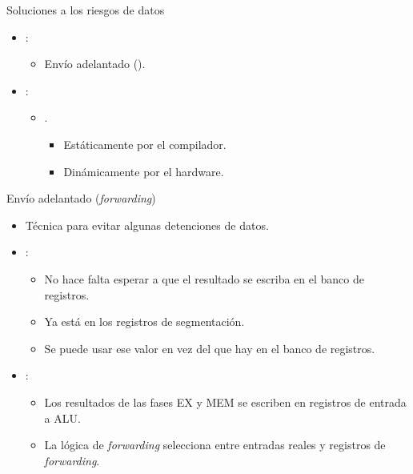 \begin{frame}[t]{Soluciones a los riesgos de datos}
\begin{itemize}
  \item {}:
    \begin{itemize}
      \item Envío adelantado ().
    \end{itemize}

  \item {}:
    \begin{itemize}
      \item {}.
        \begin{itemize}
          \item Estáticamente por el compilador.
          \item Dinámicamente por el hardware.
        \end{itemize}
    \end{itemize}  
\end{itemize}
 \end{frame}

\begin{frame}[t]{Envío adelantado (\emph{forwarding})}
\begin{itemize}
  \item Técnica para evitar algunas detenciones de datos.
  \item {}:
    \begin{itemize}
      \item No hace falta esperar a que el resultado se escriba en el banco de registros. 
      \item Ya está en los registros de segmentación.
      \item Se puede usar ese valor en vez del que hay en el banco de registros.
    \end{itemize}
  \item {}:
    \begin{itemize}
      \item Los resultados de las fases EX y MEM se escriben en registros de entrada a ALU.
      \item La lógica de \emph{forwarding} selecciona entre entradas reales y registros de \emph{forwarding}.
    \end{itemize}
\end{itemize}
\end{frame}

